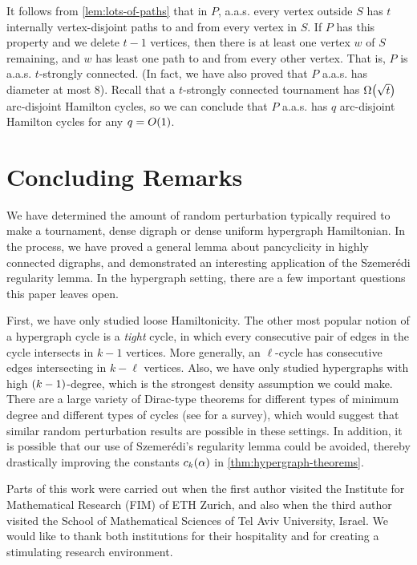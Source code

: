\documentclass[11pt,english]{article}
\theoremstyle{plain}
\theoremstyle{definition}
\theoremstyle{definition}
\theoremstyle{plain}
\theoremstyle{plain}
\theoremstyle{plain}
\theoremstyle{plain}
\theoremstyle{remark}
\theoremstyle{remark}
\let\originalleft\left
\let\originalright\right
\renewcommand{\left}{\mathopen{}\mathclose\bgroup\originalleft}
\renewcommand{\right}{\aftergroup\egroup\originalright}
\begin{document}
It follows from \ref{lem:lots-of-paths} that in $P$, a.a.s. every vertex
outside $S$ has $t$ internally vertex-disjoint paths to and from every vertex in $S$.
If $P$ has this property and we delete $t-1$ vertices, then there is at least one vertex $w$
of $S$ remaining, and $w$ has least one path to and from every other
vertex. That is, $P$ is a.a.s. $t$-strongly connected. (In fact, we have also
proved that $P$ a.a.s. has diameter at most 8). Recall that a $t$-strongly connected tournament has $\Omega\left(\sqrt t\right)$ arc-disjoint Hamilton cycles, so we can conclude that $P$ a.a.s. has $q$ arc-disjoint Hamilton cycles for any $q=O\left(1\right)$.


\section{Concluding Remarks}

We have determined the amount of random perturbation typically required to make
a tournament, dense digraph or dense uniform hypergraph Hamiltonian. In
the process, we have proved a general lemma about pancyclicity in
highly connected digraphs, and demonstrated an interesting application
of the Szemer\'edi regularity lemma. In the hypergraph setting, there are a few important questions
this paper leaves open.

First, we have only studied loose Hamiltonicity. The other most popular
notion of a hypergraph cycle is a \emph{tight} cycle, in which every
consecutive pair of edges in the cycle intersects in $k-1$ vertices.
More generally, an $\ell$-cycle has consecutive edges intersecting
in $k-\ell$ vertices. Also, we have only studied hypergraphs with
high $\left(k-1\right)$-degree, which is the strongest density assumption
we could make. There are a large variety of Dirac-type theorems for
different types of minimum degree and different types of cycles (see
\cite{RR10} for a survey), which would suggest that similar random
perturbation results are possible in these settings. In addition,
it is possible that our use of Szemer\'edi's regularity lemma could
be avoided, thereby drastically improving the constants $\chyp\left(\alpha\right)$
in \ref{thm:hypergraph-theorems}.

\medskip

 Parts of this work were carried out when the first author visited the Institute for Mathematical Research (FIM) of ETH Zurich, and also when the third author visited the School of Mathematical Sciences of Tel Aviv University, Israel. We would like to thank both institutions for their hospitality and for creating a stimulating research environment.
\end{document}
